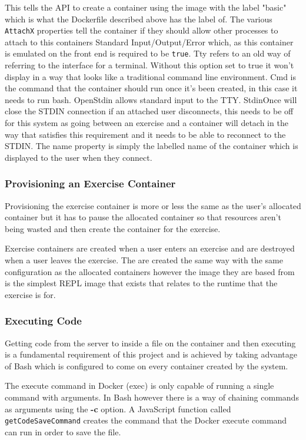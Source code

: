 This tells the API to create a container using the image with the label "basic" which is what the Dockerfile described above has the label of. The various \texttt{AttachX} properties tell the container if they should allow other processes to attach to this containers Standard Input/Output/Error which, as this container is emulated on the front end is required to be \texttt{true}. Tty refers to an old way of referring to the interface for a terminal. Without this option set to true it won't display in a way that looks like a traditional command line environment. Cmd is the command that the container should run once it's been created, in this case it needs to run bash. OpenStdin allows standard input to the TTY. StdinOnce will close the STDIN connection if an attached user disconnects, this needs to be off for this system as going between an exercise and a container will detach in the way that satisfies this requirement and it needs to be able to reconnect to the STDIN. The name property is simply the labelled name of the container which is displayed to the user when they connect.

\subsubsection{Provisioning an Exercise Container}

Provisioning the exercise container is more or less the same as the user's allocated container but it has to pause the allocated container so that resources aren't being wasted and then create the container for the exercise.

Exercise containers are created when a user enters an exercise and are destroyed when a user leaves the exercise. The are created the same way with the same configuration as the allocated containers however the image they are based from is the simplest REPL image that exists that relates to the runtime that the exercise is for.

\subsubsection{Executing Code} \label{imp-execode}

Getting code from the server to inside a file on the container and then executing is a fundamental requirement of this project and is achieved by taking advantage of Bash which is configured to come on every container created by the system.

The execute command in Docker (exec) is only capable of running a single command with arguments. In Bash however there is a way of chaining commands as arguments using the \textbf{-c} option. A JavaScript function called \texttt{getCodeSaveCommand} creates the command that the Docker execute command can run in order to save the file.

